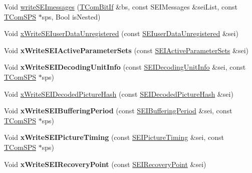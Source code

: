 \begin{DoxyCompactItemize}
\item 
Void \hyperlink{class_s_e_i_writer_ab6f3f6ad919794f1b7ad8b3b52788939}{write\+S\+E\+Imessages} (\hyperlink{class_t_com_bit_if}{T\+Com\+Bit\+If} \&bs, const S\+E\+I\+Messages \&sei\+List, const \hyperlink{class_t_com_s_p_s}{T\+Com\+S\+PS} $\ast$sps, Bool is\+Nested)
\item 
Void \hyperlink{class_s_e_i_writer_ac056ab733ae9179df6f066b477c09934}{x\+Write\+S\+E\+Iuser\+Data\+Unregistered} (const \hyperlink{class_s_e_iuser_data_unregistered}{S\+E\+Iuser\+Data\+Unregistered} \&sei)
\item 
\mbox{\label{class_s_e_i_writer_ad4e66b98e4d94795d5391194ca6d6277}} 
Void {\bfseries x\+Write\+S\+E\+I\+Active\+Parameter\+Sets} (const \hyperlink{class_s_e_i_active_parameter_sets}{S\+E\+I\+Active\+Parameter\+Sets} \&sei)
\item 
\mbox{\label{class_s_e_i_writer_a35392b01ea5f6851b0f8aba26f5a0af1}} 
Void {\bfseries x\+Write\+S\+E\+I\+Decoding\+Unit\+Info} (const \hyperlink{class_s_e_i_decoding_unit_info}{S\+E\+I\+Decoding\+Unit\+Info} \&sei, const \hyperlink{class_t_com_s_p_s}{T\+Com\+S\+PS} $\ast$sps)
\item 
Void \hyperlink{class_s_e_i_writer_ade59880722c743ab362cbf0007f88b5b}{x\+Write\+S\+E\+I\+Decoded\+Picture\+Hash} (const \hyperlink{class_s_e_i_decoded_picture_hash}{S\+E\+I\+Decoded\+Picture\+Hash} \&sei)
\item 
\mbox{\label{class_s_e_i_writer_acb6141c51f6046b15ab908d58660cba8}} 
Void {\bfseries x\+Write\+S\+E\+I\+Buffering\+Period} (const \hyperlink{class_s_e_i_buffering_period}{S\+E\+I\+Buffering\+Period} \&sei, const \hyperlink{class_t_com_s_p_s}{T\+Com\+S\+PS} $\ast$sps)
\item 
\mbox{\label{class_s_e_i_writer_a14617b8c7c15b5161c7de64fcb942f3f}} 
Void {\bfseries x\+Write\+S\+E\+I\+Picture\+Timing} (const \hyperlink{class_s_e_i_picture_timing}{S\+E\+I\+Picture\+Timing} \&sei, const \hyperlink{class_t_com_s_p_s}{T\+Com\+S\+PS} $\ast$sps)
\item 
\mbox{\label{class_s_e_i_writer_a432c5dc0310bbf8b3553cdda53f1c054}} 
Void {\bfseries x\+Write\+S\+E\+I\+Recovery\+Point} (const \hyperlink{class_s_e_i_recovery_point}{S\+E\+I\+Recovery\+Point} \&sei)

\end{DoxyCompactItemize}
